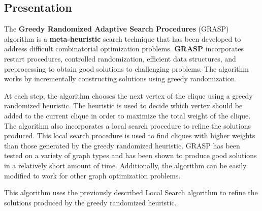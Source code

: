 
\subsection{Presentation}

The \textbf{Greedy Randomized Adaptive Search Procedures} (GRASP) algorithm is a 
\textbf{meta-heuristic} search technique that has been developed to address 
difficult combinatorial optimization problems. \textbf{GRASP} incorporates 
restart procedures, controlled randomization, efficient data structures, and 
preprocessing to obtain good solutions to challenging problems. The algorithm 
works by incrementally constructing solutions using greedy randomization. 
\bigskip

At each step, the algorithm chooses the next vertex of the clique using a greedy 
randomized heuristic. The heuristic is used to decide which vertex should be 
added to the current clique in order to maximize the total weight of the clique. 
The algorithm also incorporates a local search procedure to refine the solutions 
produced. This local search procedure is used to find cliques with higher 
weights than those generated by the greedy randomized heuristic. GRASP has been 
tested on a variety of graph types and has been shown to produce good solutions 
in a relatively short amount of time. Additionally, the algorithm can be easily 
modified to work for other graph optimization problems.
\bigskip

This algorithm uses the previously described Local Search algorithm to refine
the solutions produced by the greedy randomized heuristic.